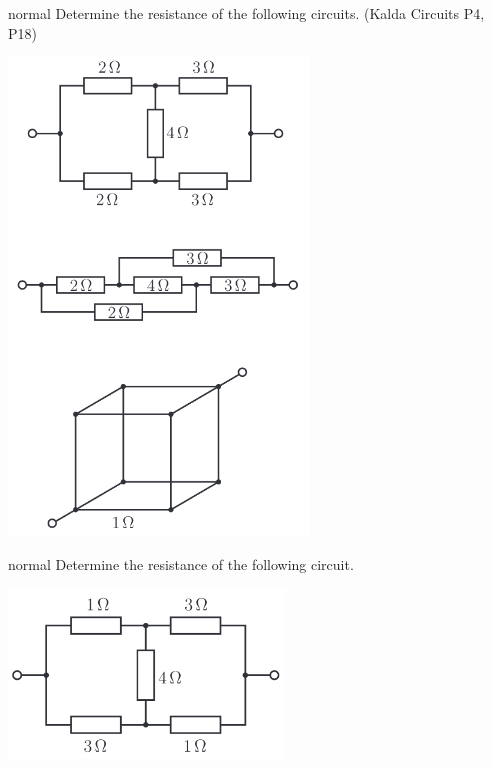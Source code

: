 \hypertarget{P23}{}
\begin{solution}{normal} %
Determine the resistance of the following circuits. (Kalda Circuits P4, P18)
\begin{center}
    \includegraphics[width=0.6\textwidth]{S1 Figures/S1-23.png}
\end{center}
\end{solution}

\hypertarget{P24}{}
\begin{solution}{normal} %
Determine the resistance of the following circuit.
\begin{center}
    \includegraphics[width=0.55\textwidth]{S1 Figures/S1-24.png}
\end{center}
\end{solution}

